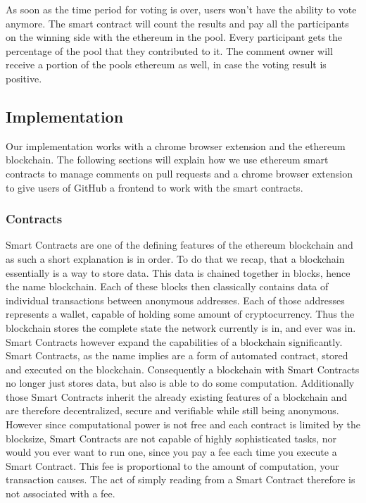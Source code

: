 \documentclass[sigconf]{acmart}
\begin{document}
As soon as the time period for voting is over, users won’t have the ability to vote anymore. The smart contract will count the results and pay all the participants on the winning side with the ethereum in the pool. Every participant gets the percentage of the pool that they contributed to it.
The comment owner will receive a portion of the pools ethereum as well, in case the voting result is positive.


\subsection{Implementation}

Our implementation works with a chrome browser extension \cite{extensionDocs} and the ethereum blockchain.
The following sections will explain how we use ethereum smart contracts to manage comments on pull requests and a chrome browser extension to give users of GitHub a frontend to work with the smart contracts.


\subsubsection{Contracts}

Smart Contracts are one of the defining features of the ethereum blockchain and as such a short explanation is in order. To do that we recap, that a blockchain essentially is a way to store data. This data is chained together in blocks, hence the name blockchain. Each of these blocks then classically contains data of individual transactions between anonymous addresses. Each of those addresses represents a wallet, capable of holding some amount of cryptocurrency. Thus the blockchain stores the complete state the network currently is in, and ever was in. Smart Contracts however expand the capabilities of a blockchain significantly. Smart Contracts, as the name implies are a form of automated contract, stored and executed on the blockchain. Consequently a blockchain with Smart Contracts no longer just stores data, but also is able to do some computation. Additionally those Smart Contracts inherit the already existing features of a blockchain and are therefore decentralized, secure and verifiable while still being anonymous. However since computational power is not free and each contract is limited by the blocksize, Smart Contracts are not capable of highly sophisticated tasks, nor would you ever want to run one, since you pay a fee each time you execute a Smart Contract. This fee is proportional to the amount of computation, your transaction causes. The act of simply reading from a Smart Contract therefore is not associated with a fee.
\end{document}
